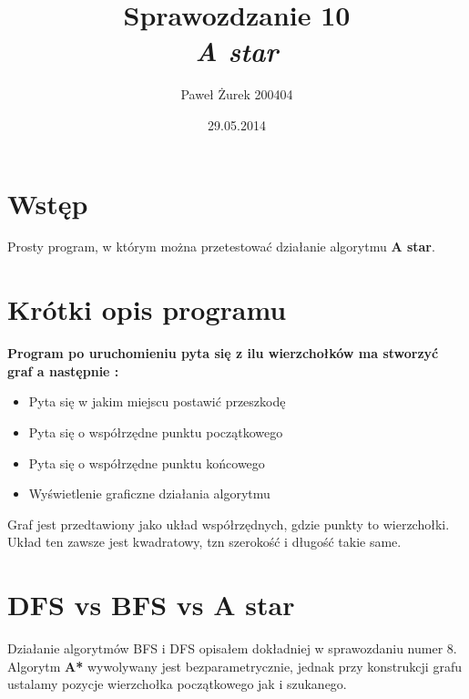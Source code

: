 \documentclass[10 pt]{article}
\title{Sprawozdzanie 10 \\ \emph{\textbf{A star }}}
\author{Paweł Żurek 200404}
\date{29.05.2014}
\begin{document}
\tableofcontents
\maketitle
\section{Wstęp}
Prosty program, w którym można przetestować działanie algorytmu \textbf{A star}.
\section{Krótki opis programu}
\textbf{Program po uruchomieniu pyta się z ilu wierzchołków ma stworzyć graf a następnie : }
\begin{itemize}
\item Pyta się w jakim miejscu postawić przeszkodę
\item Pyta się o współrzędne punktu początkowego
\item Pyta się o współrzędne punktu końcowego
\item Wyświetlenie graficzne działania algorytmu
\end{itemize}
Graf jest przedtawiony jako układ współrzędnych, gdzie punkty to wierzchołki. Układ ten zawsze jest kwadratowy, tzn szerokość i długość takie same.

\section{\textbf{DFS} vs \textbf{BFS} vs \textbf{A star}}
Działanie algorytmów BFS i DFS opisałem dokładniej w sprawozdaniu numer 8.
\\
Algorytm \textbf{A*} wywolywany jest bezparametrycznie, jednak przy konstrukcji grafu ustalamy pozycje wierzchołka początkowego jak i szukanego.
\end{document}
